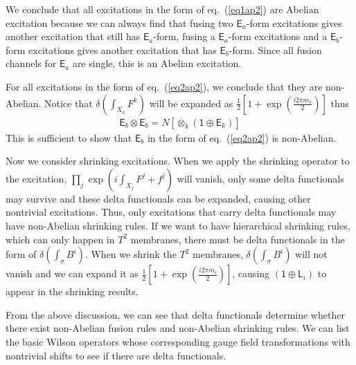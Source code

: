 \documentclass[11pt,nofootinbib,preprint]{revtex4-1}
\begin{document}
We conclude that all excitations in the form of eq.~(\ref{eq1ap2}) are Abelian excitation because we can always find that fusing two $\mathsf{E}_a$-form excitations gives another excitation that still has $\mathsf{E}_a$-form, fusing a $\mathsf{E}_a$-form excitations and a $\mathsf{E}_b$-form excitations gives another excitation that has $\mathsf{E}_b$-form. Since all fusion channels for $\mathsf{E}_a$ are single, this is an Abelian excitation.

For all excitations in the form of eq.~(\ref{eq2ap2}), we conclude that they are non-Abelian. Notice that $\delta \left( \int_{X _k}{F^k} \right) $ will be expanded as $\frac{1}{2}\left[ 1+\exp \left( \frac{i2\pi m_k}{2} \right) \right] $ thus 
\begin{align}
	\mathsf{E}_b\otimes \mathsf{E}_b=N\left[ \otimes _k\left( \mathsf{1}\oplus \mathsf{E}_k \right) \right] 
\end{align}
This is sufficient to show that $\mathsf{E}_b$ in the form of eq.~(\ref{eq2ap2}) is non-Abelian.

Now we consider shrinking excitations. When we apply the shrinking operator to the excitation, $\prod_j{\exp \left( i\int_{X _j}{F^j+f^j} \right)}$ will vanish, only some delta functionals may survive and these delta functionals can be expanded, causing other nontrivial excitations. Thus, only excitations that carry delta functionals may have non-Abelian shrinking rules. If we want to have hierarchical shrinking rules, which can only happen in $T^2$ membranes, there must be delta functionals in the form of $\delta \left( \int_{\sigma}{B^i} \right) $. When we shrink the $T^2$ membranes, $\delta \left( \int_{\sigma}{B^i} \right) $ will not vanish and we can expand it as $\frac{1}{2}\left[ 1+\exp \left( \frac{i2\pi m_i}{2} \right) \right] $, causing $\left( \mathsf{1}\oplus \mathsf{L}_i \right)$ to appear in the shrinking results.

From the above discussion, we can see that delta functionals determine whether there exist non-Abelian fusion rules and non-Abelian shrinking rules. We can list the basic Wilson operators whose corresponding gauge field transformations with nontrivial shifts to see if there are delta functionals.
\end{document}
